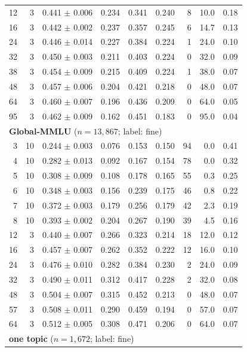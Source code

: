 \begin{longtable}{rrrrrrrrr}
12 & 3 & 0.441 $\pm$ 0.006 & 0.234 & 0.341 & 0.240 & 8 & 10.0 & 0.18 \\
16 & 3 & 0.442 $\pm$ 0.002 & 0.237 & 0.357 & 0.245 & 6 & 14.7 & 0.13 \\
24 & 3 & 0.446 $\pm$ 0.014 & 0.227 & 0.384 & 0.224 & 1 & 24.0 & 0.10 \\
32 & 3 & 0.450 $\pm$ 0.003 & 0.211 & 0.403 & 0.224 & 0 & 32.0 & 0.09 \\
38 & 3 & 0.454 $\pm$ 0.009 & 0.215 & 0.409 & 0.224 & 1 & 38.0 & 0.07 \\
48 & 3 & 0.457 $\pm$ 0.006 & 0.204 & 0.421 & 0.218 & 0 & 48.0 & 0.07 \\
64 & 3 & 0.460 $\pm$ 0.007 & 0.196 & 0.436 & 0.209 & 0 & 64.0 & 0.05 \\
95 & 3 & 0.462 $\pm$ 0.009 & 0.162 & 0.451 & 0.183 & 0 & 95.0 & 0.04 \\
\midrule
\multicolumn{9}{l}{\textbf{Global-MMLU} ($n = 13,867$; label: fine)} \\
\midrule
3 & 10 & 0.244 $\pm$ 0.003 & 0.076 & 0.153 & 0.150 & 94 & 0.0 & 0.41 \\
4 & 10 & 0.282 $\pm$ 0.013 & 0.092 & 0.167 & 0.154 & 78 & 0.0 & 0.32 \\
5 & 10 & 0.308 $\pm$ 0.009 & 0.108 & 0.178 & 0.165 & 55 & 0.3 & 0.25 \\
6 & 10 & 0.348 $\pm$ 0.003 & 0.156 & 0.239 & 0.175 & 46 & 0.8 & 0.22 \\
7 & 10 & 0.372 $\pm$ 0.003 & 0.179 & 0.256 & 0.179 & 42 & 2.3 & 0.19 \\
8 & 10 & 0.393 $\pm$ 0.002 & 0.204 & 0.267 & 0.190 & 39 & 4.5 & 0.16 \\
12 & 3 & 0.440 $\pm$ 0.007 & 0.266 & 0.323 & 0.214 & 18 & 12.0 & 0.12 \\
16 & 3 & 0.457 $\pm$ 0.007 & 0.262 & 0.352 & 0.222 & 12 & 16.0 & 0.10 \\
24 & 3 & 0.476 $\pm$ 0.010 & 0.282 & 0.384 & 0.230 & 2 & 24.0 & 0.09 \\
32 & 3 & 0.490 $\pm$ 0.011 & 0.312 & 0.417 & 0.228 & 2 & 32.0 & 0.08 \\
48 & 3 & 0.504 $\pm$ 0.007 & 0.315 & 0.452 & 0.213 & 0 & 48.0 & 0.07 \\
57 & 3 & 0.508 $\pm$ 0.011 & 0.290 & 0.459 & 0.194 & 0 & 57.0 & 0.07 \\
64 & 3 & 0.512 $\pm$ 0.005 & 0.308 & 0.471 & 0.206 & 0 & 64.0 & 0.07 \\
\midrule
\multicolumn{9}{l}{\textbf{one topic} ($n = 1,672$; label: fine)} \\

\end{longtable}
